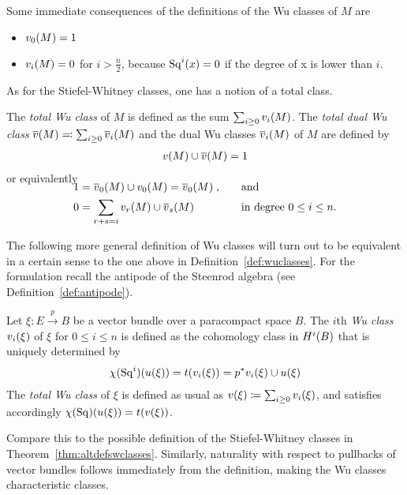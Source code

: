 \begin{Rem}
  Some immediate consequences of the definitions of the Wu classes of
  $M$ are
  \begin{itemize}
  \item ${v_{0}}(M) = 1$
  \item ${v_{i}}(M) = 0$ for $i>\frac n 2$, because $\mathrm{Sq}^{i}(x) = 0$ if the
    degree of x is lower than $i$.
  \end{itemize}
\end{Rem}

As for the Stiefel-Whitney classes, one has a notion of a total class.
\begin{Def}\label{def:dualwuclasses}
  The \emph{total Wu class} of $M$ is defined as the sum
  $\sum_{i\geq0}{v_{i}}(M)$. The \emph{total dual Wu class}
  ${\overline{v}}(M)\eqqcolon \sum_{i\geq 0}{\overline{v}_{i}}(M)$
  and the dual Wu classes ${\overline{v}_{i}}(M)$
  of $M$ are defined by
  \begin{gather*}
    {v}(M) \cup {\overline{v}}(M) = 1
  \end{gather*}
  or equivalently
  \begin{alignat*}{4}
    \SwapAboveDisplaySkip
    1 &= \dualv{0}{M} \cup \v{0}{M} = \dualv{0}{M}
    \;,\quad
    &&\text{and}\\
    0 &= \sum_{r+s=i}\v{r}{M}\cup\dualv{s}{M}
    &&\text{in degree $0\leq i\leq n$.}
  \end{alignat*}
\end{Def}

The following more general definition of Wu classes
will turn out to be equivalent in a certain sense to the one above in
Definition~\ref{def:wuclasses}.
For the formulation recall the antipode of the Steenrod algebra
(see Definition~\ref{def:antipode}).
\begin{Def}\label{def:altwuclasses}
  Let $\xi\colon E\xrightarrow{p} B$ be a vector bundle over a
  paracompact space $B$.
  The $i$th \emph{Wu class} ${v_{i}}(\xi)$ of $\xi$ for $0\leq i\leq n$
  is defined as the cohomology class in $H^i(B)$ that is uniquely
  determined by
  \begin{gather*}
    \chi(\mathrm{Sq}^{i})({u}(\xi)) = t({v_{i}}(\xi)) = {p}^* {v_{i}}(\xi) \cup {u}(\xi)
  \end{gather*}
  The \emph{total Wu class} of $\xi$ is defined as usual as
  ${v}(\xi)\coloneqq\sum_{i\geq0}{v_{i}}(\xi)$, and satisfies accordingly 
  $\chi(\mathrm{Sq})({u}(\xi))=t({v}(\xi))$.
\end{Def}
\begin{Rem}
  Compare this to the possible definition of the Stiefel-Whitney
  classes in Theorem~\ref{thm:altdefswclasses}.
  Similarly, naturality with respect to pullbacks of vector bundles
  follows immediately from the definition, making the Wu classes
  characteristic classes.
\end{Rem}

